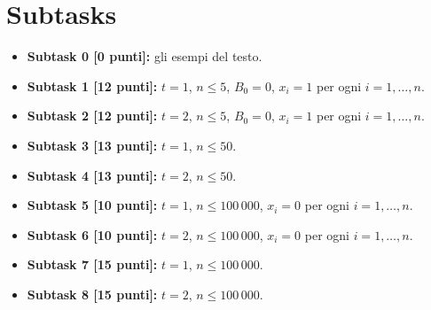   \section*{Subtasks}
  \begin{itemize}
    \item \textbf{Subtask 0 [0 punti]:} gli esempi del testo.
    \item \textbf{Subtask 1 [12 punti]:} $t=1$, $n \leq 5$, $B_0 = 0$, $x_i = 1$ per ogni $i=1,\ldots, n$.
    \item \textbf{Subtask 2 [12 punti]:} $t=2$, $n \leq 5$, $B_0 = 0$, $x_i = 1$ per ogni $i=1,\ldots, n$.
    \item \textbf{Subtask 3 [13 punti]:} $t=1$, $n \leq 50$.
    \item \textbf{Subtask 4 [13 punti]:} $t=2$, $n \leq 50$.
    \item \textbf{Subtask 5 [10 punti]:} $t=1$, $n \leq 100\,000$, $x_i = 0$ per ogni $i=1,\ldots, n$.
    \item \textbf{Subtask 6 [10 punti]:} $t=2$, $n \leq 100\,000$, $x_i = 0$ per ogni $i=1,\ldots, n$.
    \item \textbf{Subtask 7 [15 punti]:} $t=1$, $n \leq 100\,000$.
    \item \textbf{Subtask 8 [15 punti]:} $t=2$, $n \leq 100\,000$.      
  \end{itemize}
  
